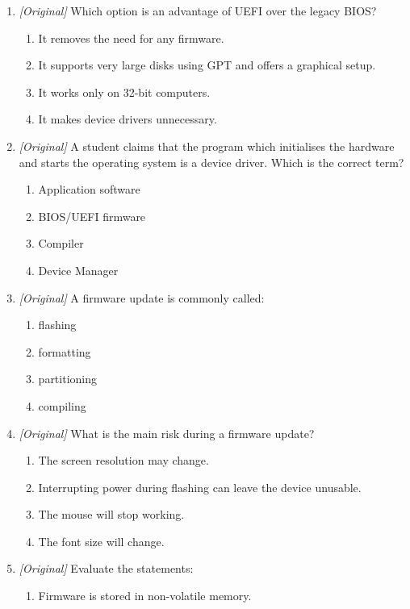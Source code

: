 \begin{enumerate}[label=\textbf{Q\arabic*.}, leftmargin=*]
\begin{enumerate}[label=\Alph*.]
  \end{enumerate}
\item \textit{[Original]} Which option is an advantage of UEFI over the
  legacy BIOS?
  \begin{enumerate}[label=\Alph*.]
    \item It removes the need for any firmware.
    \item It supports very large disks using GPT and offers a graphical
      setup.
    \item It works only on 32-bit computers.
    \item It makes device drivers unnecessary.
  \end{enumerate}
\item \textit{[Original]} A student claims that the program which initialises
  the hardware and starts the operating system is a device driver. Which is
  the correct term?
  \begin{enumerate}[label=\Alph*.]
    \item Application software
    \item BIOS/UEFI firmware
    \item Compiler
    \item Device Manager
  \end{enumerate}
\item \textit{[Original]} A firmware update is commonly called:
  \begin{enumerate}[label=\Alph*.]
    \item flashing
    \item formatting
    \item partitioning
    \item compiling
  \end{enumerate}
\item \textit{[Original]} What is the main risk during a firmware update?
  \begin{enumerate}[label=\Alph*.]
    \item The screen resolution may change.
    \item Interrupting power during flashing can leave the device unusable.
    \item The mouse will stop working.
    \item The font size will change.
  \end{enumerate}
\item \textit{[Original]} Evaluate the statements:
  \begin{enumerate}[label=\Roman*.]
    \item Firmware is stored in non-volatile memory.

\end{enumerate}
\end{enumerate}

